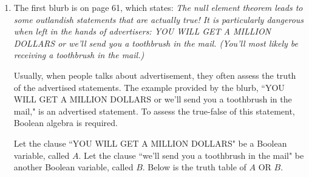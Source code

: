 \documentclass[12pt]{article}
\begin{document}
\begin{enumerate}
  \item The first blurb is on page 61, which states: \textit{The null element theorem leads to some outlandish statements that are actually true! It is particularly dangerous when left in the hands of advertisers: YOU WILL GET A MILLION DOLLARS or we'll send you a toothbrush in the mail. (You'll most likely be receiving a toothbrush in the mail.)}

  Usually, when people talks about advertisement, they often assess the truth of the advertised statements. The example provided by the blurb, ``YOU WILL GET A MILLION DOLLARS or we'll send you a toothbrush in the mail," is an advertised statement. To assess the true-false of this statement, Boolean algebra is required.

  Let the clause ``YOU WILL GET A MILLION DOLLARS" be a Boolean variable, called $A$. Let the clause ``we'll send you a toothbrush in the mail" be another Boolean variable, called $B$. Below is the truth table of $A\text{ OR }B$.


\end{enumerate}
\end{document}
